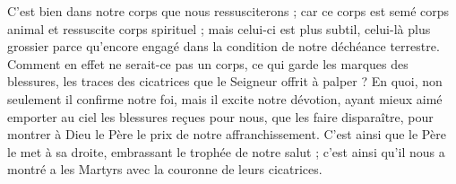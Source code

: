  C’est bien dans notre corps que nous ressusciterons ; car ce corps est semé corps animal et ressuscite corps spirituel ; mais celui-ci est plus subtil, celui-là plus grossier parce qu’encore engagé dans la condition de notre déchéance terrestre. Comment en effet ne serait-ce pas un corps, ce qui garde les marques des blessures, les traces des cicatrices que le Seigneur offrit à palper ? En quoi, non seulement il confirme notre foi, mais il excite notre dévotion, ayant mieux aimé emporter au ciel les blessures reçues pour nous, que les faire disparaître, pour montrer à Dieu le Père le prix de notre affranchissement. C’est ainsi que le Père le met à sa droite, embrassant le trophée de notre salut ; c’est ainsi qu’il nous a montré a les Martyrs avec la couronne de leurs cicatrices.